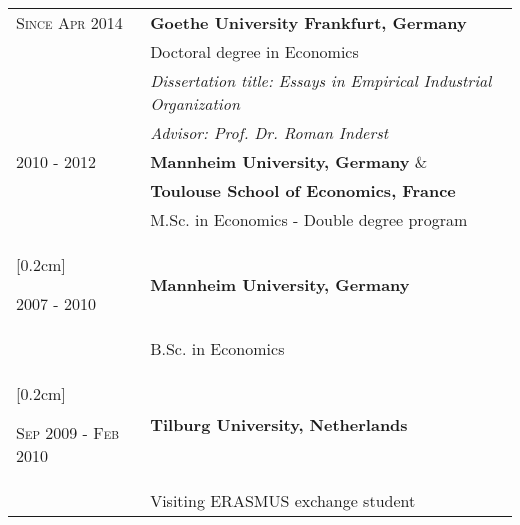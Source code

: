\documentclass[a4paper,10pt]{article} %
\begin{document}
\begin{tabular}{P{4.5cm} P{11cm}}
\textsc{Since  Apr 2014}  & \textbf{Goethe University Frankfurt, Germany} \\
	&Doctoral degree in Economics  \\
	&\small \emph{Dissertation title: Essays in Empirical Industrial Organization} \\
	&\small \emph{Advisor: Prof. Dr. Roman Inderst} \\[0.2cm] 


 \textsc{2010 - 2012} & \textbf{Mannheim University, Germany} \&  \\
 & \textbf{Toulouse School of Economics, France} \\ 
									&	 M.Sc. in Economics - Double degree program    \\
									[0.2cm] 


 \textsc{2007 - 2010} &  \textbf{Mannheim University, Germany}  \\
										 & B.Sc. in Economics  \\
									[0.2cm] 

	\textsc{Sep 2009 - Feb 2010} & \textbf{Tilburg University, Netherlands}   \\
										  & Visiting ERASMUS exchange student  \\[0.2cm] 



\end{tabular}


\end{document}
